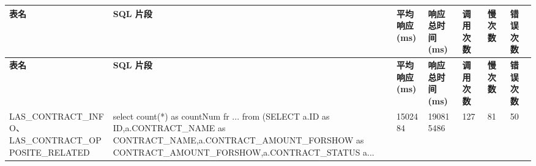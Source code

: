 \setlength{\LTleft}{0pt}
\setlength{\LTright}{0pt}
\setlength{\tabcolsep}{3.6pt}
\renewcommand{\arraystretch}{1.45}
\begin{longtable}{>{\RaggedRight\arraybackslash}p{}>{\RaggedRight\arraybackslash}p{}>{\RaggedRight\arraybackslash}p{}>{\RaggedRight\arraybackslash}p{}>{\RaggedRight\arraybackslash}p{}>{\RaggedRight\arraybackslash}p{}>{\RaggedRight\arraybackslash}p{}}
\hline
\cellcolor{HeaderBlue}\color{white}\bfseries 表名 & \cellcolor{HeaderBlue}\color{white}\bfseries SQL 片段 & \cellcolor{HeaderBlue}\color{white}\bfseries 平均响应(ms) & \cellcolor{HeaderBlue}\color{white}\bfseries 响应总时间(ms) & \cellcolor{HeaderBlue}\color{white}\bfseries 调用次数 & \cellcolor{HeaderBlue}\color{white}\bfseries 慢次数 & \cellcolor{HeaderBlue}\color{white}\bfseries 错误次数 \\
\hline
\endfirsthead
\hline
\cellcolor{HeaderBlue}\color{white}\bfseries 表名 & \cellcolor{HeaderBlue}\color{white}\bfseries SQL 片段 & \cellcolor{HeaderBlue}\color{white}\bfseries 平均响应(ms) & \cellcolor{HeaderBlue}\color{white}\bfseries 响应总时间(ms) & \cellcolor{HeaderBlue}\color{white}\bfseries 调用次数 & \cellcolor{HeaderBlue}\color{white}\bfseries 慢次数 & \cellcolor{HeaderBlue}\color{white}\bfseries 错误次数 \\
\hline
\endhead
\cellcolor{SoftBlue} LAS\_\hspace{0pt}CONTRACT\_\hspace{0pt}INFO、LAS\_\hspace{0pt}CONTRACT\_\hspace{0pt}OPPOSITE\_\hspace{0pt}RELATED & \cellcolor{SoftBlue} select count(*) as countNum fr .\hspace{0pt}.\hspace{0pt}.\hspace{0pt} from (SELECT a.\hspace{0pt}ID as ID,\hspace{0pt}a.\hspace{0pt}CONTRACT\_\hspace{0pt}NAME as CONTRACT\_\hspace{0pt}NAME,\hspace{0pt}a.\hspace{0pt}CONTRACT\_\hspace{0pt}AMOUNT\_\hspace{0pt}FORSHOW as CONTRACT\_\hspace{0pt}AMOUNT\_\hspace{0pt}FORSHOW,\hspace{0pt}a.\hspace{0pt}CONTRACT\_\hspace{0pt}STATUS a.\hspace{0pt}.\hspace{0pt}.\hspace{0pt} & \cellcolor{SoftBlue} 1502484 & \cellcolor{SoftBlue} 190815486 & \cellcolor{SoftBlue} 127 & \cellcolor{SoftBlue} 81 & \cellcolor{SoftBlue} 50 \\

\end{longtable}
